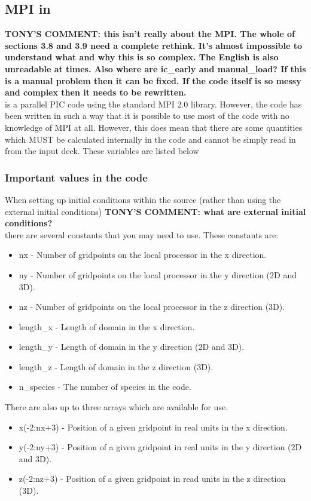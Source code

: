 \documentclass[12pt,a4paper]{article}
\newcommand{\EPOCH}{{\color{warwickdark}\fontfamily{phv}\selectfont{EPOCH}}}
\newcommand{\tony}[1]{{\color{warwickred} \bf{TONY'S COMMENT:} \bf{#1}}\\}
\begin{document}
\subsection{MPI in {\EPOCH}}
\label{sec:mpi}
\tony{this isn't really about the MPI. The whole of sections 3.8 and 3.9
need a complete rethink. It's almost impossible to understand what and why
this is so complex. The English is also unreadable at times. Also where
are ic\_early and manual\_load? If this is a manual problem then it can be
fixed. If the code itself is so messy and complex then it needs to be
rewritten.}
{\EPOCH} is a parallel PIC code using the standard MPI 2.0 library.
However, the
code has been written in such a way that it is possible to use most of the code
with no knowledge of MPI at all. However, this does mean that there are some
quantities which MUST be calculated internally in the code and cannot be simply
read in from the input deck. These variables are listed below

\subsubsection{Important values in the {\EPOCH} code}
When setting up initial conditions within the {\EPOCH} source (rather than
using the external initial conditions)
\tony{what are external initial conditions?}
there are several constants that you may need to use. These constants are:
\begin{itemize}
\item nx - Number of gridpoints on the local processor in the x direction.
\item ny - Number of gridpoints on the local processor in the y direction (2D
  and 3D).
\item nz - Number of gridpoints on the local processor in the z direction (3D).
\item length\_x - Length of domain in the x direction.
\item length\_y - Length of domain in the y direction (2D and 3D).
\item length\_z - Length of domain in the z direction (3D).
\item n\_species - The number of species in the code.
\end{itemize}

There are also up to three arrays which are available for use.
\begin{itemize}
\item x(-2:nx+3) - Position of a given gridpoint in real units in the x
  direction.
\item y(-2:ny+3) - Position of a given gridpoint in real units in the y
  direction (2D and 3D).
\item z(-2:nz+3) - Position of a given gridpoint in read units in the z
  direction (3D).
\end{itemize}
\end{document}
